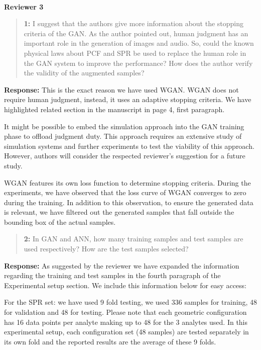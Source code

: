 \documentclass{article}
\begin{document}
	~
	
	{\bfseries\large Reviewer 3}
	
	\begin{quote}
		\textbf{1: }I suggest that the authors give more information about the stopping criteria of the GAN. As the author pointed out, human judgment has an important role in the generation of images and audio. So, could the known physical laws about PCF and SPR be used to replace the human role in the GAN system to improve the performance? How does the author verify the validity of the augmented samples?
	\end{quote}
	
	\textbf{Response: }This is the exact reason we have used WGAN. WGAN does not require human judgment, instead, it uses an adaptive stopping criteria. We have highlighted related section in the manuscript in page 4, first paragraph.
	
	It might be possible to embed the simulation approach into the GAN training phase to offload judgment duty. This approach requires an extensive study of simulation systems and further experiments to test the viability of this approach. However, authors will consider the respected reviewer's suggestion for a future study.
	
	WGAN features its own loss function to determine stopping criteria. During the experiments, we have observed that the loss curve of WGAN converges to zero during the training. In addition to this observation, to ensure the generated data is relevant, we have filtered out the generated samples that fall outside the bounding box of the actual samples.
	
	\begin{quote}
		\textbf{2: }In GAN and ANN, how many training samples and test samples are used respectively? How are the test samples selected?
	\end{quote}
	
	\textbf{Response: }As suggested by the reviewer we have expanded the information regarding the training and test samples in the fourth paragraph of the Experimental setup section. We include this information below for easy access:
	
	For the SPR set: we have used 9 fold testing, we used 336 samples for training, 48 for validation and 48 for testing. Please note that each geometric configuration has 16 data points per analyte making up to 48 for the 3 analytes used. In this experimental setup, each configuration set (48 samples) are tested separately in its own fold and the reported results are the average of these 9 folds.
	
\end{document}
